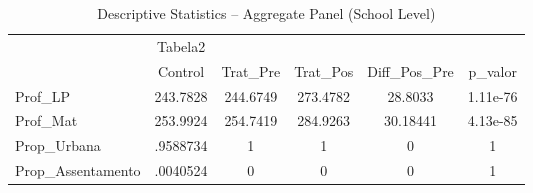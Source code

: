 ﻿\begin{table}[htbp]\centering
\caption{Descriptive Statistics -- Aggregate Panel (School Level)}
\begin{tabular}{l*{5}{c}}
\toprule
            &     Tabela2&            &            &            &            \\
            &    Control&    Trat\_Pre&    Trat\_Pos&Diff\_Pos\_Pre&     p\_valor\\
\midrule
Prof\_LP     &    243.7828&    244.6749&    273.4782&     28.8033&    1.11e-76\\
Prof\_Mat    &    253.9924&    254.7419&    284.9263&    30.18441&    4.13e-85\\
Prop\_Urbana &    .9588734&           1&           1&           0&           1\\
Prop\_Assentamento&    .0040524&           0&           0&           0&           1\\
\bottomrule
\end{tabular}
\end{table}


